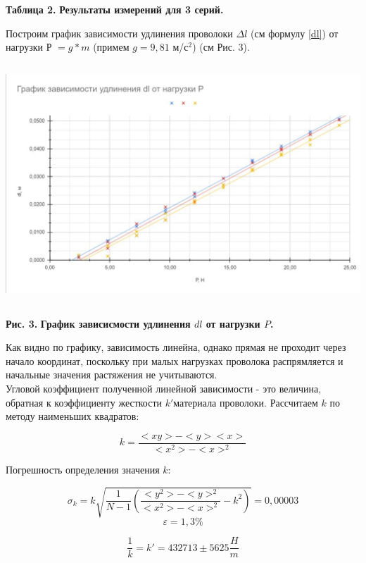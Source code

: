 \begin{flushright}
{\scriptsize \textbf{Таблица 2.} \textbf {Результаты измерений для 3 серий.}}
\end{flushright}    


    Построим график зависимости удлинения проволоки $\Delta l$ (см формулу \eqref{dl}) от нагрузки Р $= g*m$ (примем $g = 9,81$ м/$с^2$) (см Рис. 3). 
    
\begin{center}
\includegraphics[width=14cm, height=9cm]{dlp.jpeg}
\end{center}
\begin{flushright}
{\scriptsize \textbf{Рис. 3.} \textbf {График зависисмости удлинения $dl$ от нагрузки $P$.}}
\end{flushright}
    
    Как видно по графику, зависимость линейна, однако прямая не проходит через начало координат, поскольку при малых нагрузках проволока распрямляется и начальные значения растяжения не учитываются.\\
    
    
    Угловой коэффициент полученной линейной зависимости - это величина, обратная к коэффициенту жесткости $k'$материала проволоки. Рассчитаем $k$ по методу наименьших квадратов:

    
\[k = \frac{<xy> - <y><x>}{<x^2> - <x>^2}\]    
    
    Погрешность определения значения $k$:
    
\[\sigma_{k} = k \sqrt{\frac{1}{N-1} \left(\frac{<y^2> - <y>^2}{<x^2> - <x>^2} - k^2\right)} = 0,00003\]
\[\varepsilon =  1,3 \%\]

\[\frac{1}{k} = k' = 432 713 \pm 5625 \frac{H}{m}\]


